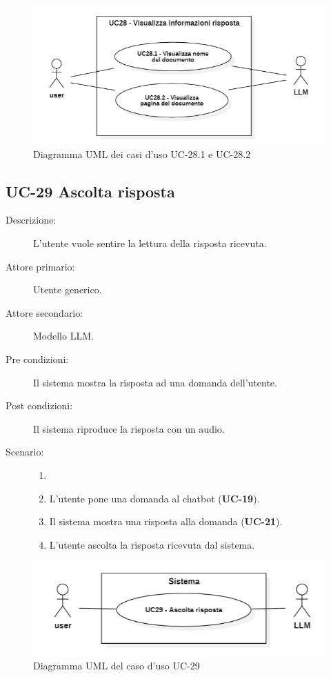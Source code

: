 \begin{figure}[H]
    \centering
    \includegraphics[width=0.9\linewidth]{UC28.1.PNG} 
    \caption{Diagramma UML dei casi d'uso UC-28.1 e UC-28.2}
    \label{fig:UC28.1}
\end{figure}

\subsection{UC-29 Ascolta risposta}
\begin{description}
    \item[Descrizione:] L'utente vuole sentire la lettura della risposta ricevuta.
    \item[Attore primario:] Utente generico.
    \item[Attore secondario:] Modello LLM.
    \item[Pre condizioni:] Il sistema mostra la risposta ad una domanda dell'utente.
    \item[Post condizioni:] Il sistema riproduce la risposta con un audio.
    \item[Scenario:]
    \begin{enumerate}
        \item[]
        \item L’utente pone una domanda al chatbot (\textbf{UC-19}).
        \item Il sistema mostra una risposta alla domanda (\textbf{UC-21}).
        \item L'utente ascolta la risposta ricevuta dal sistema.
    \end{enumerate}
\end{description}

\begin{figure}[H]
    \centering
    \includegraphics[width=0.9\linewidth]{UC29.png} 
    \caption{Diagramma UML del caso d'uso UC-29}
    \label{fig:UC29}
\end{figure}
